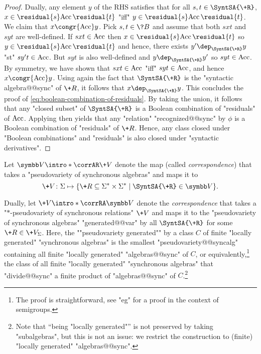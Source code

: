 \begin{proof}
	Dually, any element $y$ of the RHS satisfies that for all $s, t \in \SyntSA{\+R}$,
	$x \in \residual{s} \Acc\,\residual{t}$ "iff" $y \in \residual{s} \Acc\,\residual{t}$.
	We claim that $x \congr{\Acc} y$. Pick $s, t \in \?B$ and assume that
	both $sxt$ and $syt$ are well-defined. If $sxt \in \textrm{Acc}$ then $x \in \residual{s} \Acc\,\residual{t}$ so $y \in \residual{s} \Acc\,\residual{t}$ and hence, there
	exists $y' \dep_{\SyntSA{\+R}} y$ "st" $sy't \in \textrm{Acc}$. But $syt$ is also well-defined
	and $y \dep_{\SyntSA{\+R}} y'$ so $syt \in \textrm{Acc}$. By symmetry, we have shown that
	$sxt \in \textrm{Acc}$ "iff" $syt \in \textrm{Acc}$, and hence $x \congr{\Acc} y$.
	Using again the fact that $\SyntSA{\+R}$ is the "syntactic algebra@@sync" of $\+R$, it 
	follows that $x \dep_{\SyntSA{\+R}} y$. This concludes the proof of
	\eqref{eq:boolean-combination-of-residuals}. By taking the union, it
	follows that any "closed subset" of $\SyntSA{\+R}$ is a Boolean combination
	of "residuals" of $\textrm{Acc}$. Applying 
	then yields that any "relation" "recognized@@sync" by $\phi$ is a Boolean combination of 
	"residuals" of $\+R$. Hence, any class closed under "Boolean combinations" and
	"residuals" is also closed under "syntactic derivatives".
\end{proof}

Let \AP$\B{V} \intro*\corrAR \+V$ denote the map (called \emph{correspondence}) that takes a 
"pseudovariety of synchronous algebras" and maps it to
\[\+V\colon \Sigma \mapsto \{\+R \subseteq \Sigma^*\times \Sigma^* \mid \SyntSA{\+R} \in \B{V}\}.\]

Dually, let \AP$\+V \intro*\corrRA \B{V}$ denote the \emph{correspondence} that takes
a "$\ast$-pseudo\-variety of synchronous relations" $\+V$
and maps it to the "pseudovariety of synchronous algebras" "generated@@var" by
all $\SyntSA{\+R}$ for some $\+R \in \+V_{\Sigma}$.
Here, the ""pseudovariety generated"" by a class $C$
of finite "locally generated" "synchronous algebras"
is the smallest "pseudovariety@@syncalg" containing
all finite "locally generated" "algebras@@sync" of $C$,
or equivalently,\footnote{The proof is straightforward,
see "eg" \cite[Proposition XI.1.1, p.~190]{Pin2022MathematicalFoundations} for a proof in the context of semigroups.} the class of all finite "locally generated" "synchronous algebras" 
that "divide@@sync" a finite product of "algebras@@sync" of $C$.\footnote{Note that ``being "locally generated"'' is not preserved by taking "subalgebras", but this is not an issue: we restrict the construction to (finite) "locally generated" "algebras@@sync".}

